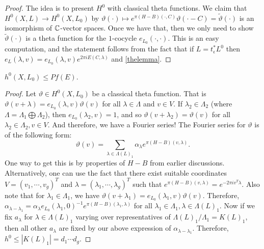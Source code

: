 \begin{proof}
The idea is to present $H^0$ with classical theta functions. We claim that $H^0(X,L)\to H^0(X,L_0)$ by $\vartheta(\cdot)\mapsto e^{\pi(H-B)(\cdot,C)}\vartheta(\cdot-C)=\tilde{\vartheta}(\cdot)$ is an isomorphism of ${\mathbb C}$-vector spaces. Once we have that, then we only need to show $\tilde{\vartheta}(\cdot)$ is a theta function for the $1$-cocycle $e_{L_0}(\cdot,\cdot)$. This is an easy computation, and the statement follows from the fact that if $L=t_\epsilon^* L^0$ then $e_L(\lambda,v)=e_{L_0}(\lambda,v)e^{2\pi i E(C,\lambda)}$ and \ref{thelemma}.
\end{proof}

\begin{lemma}
$h^0(X,L_0)\leq Pf(E)$.
\end{lemma}

\begin{proof}
Let $\vartheta\in H^0(X,L_0)$ be a classical theta function. That is $\vartheta(v+\lambda)=e_{L_0}(\lambda,v)\vartheta(v)$ for all $\lambda\in \Lambda$ and $v\in V$. If $\lambda_2\in \Lambda_2$ (where $\Lambda=\Lambda_1\bigoplus \Lambda_2$), then $e_{L_0}(\lambda_2,v)=1$, and so $\vartheta(v+\lambda_2)=\vartheta(v)$ for all $\lambda_2\in \Lambda_2, v\in V$. And therefore, we have a Fourier series! The Fourier series for $\vartheta$ is of the following form: 
$$\vartheta(v)=\sum_{\lambda\in \Lambda(L)_1}\alpha_\lambda e^{\pi (H-B)(v,\lambda)}.$$
One way to get this is by properties of $H-B$ from earlier discussions. Alternatively, one can use the fact that there exist suitable coordinates $V=(v_1,\cdots, v_g)^T$ and $\lambda=(\lambda_1,\cdots,\lambda_g)^T$ such that $e^{\pi(H-B)(v,\lambda)}=e^{-2\pi i v^T\lambda}$. 
Also note that for $\lambda_1\in \Lambda_1$, we have $\vartheta(v+\lambda_1)=e_{L_0}(\lambda_1,v)\vartheta(v)$. Therefore, 
$\alpha_{\lambda-\lambda_1}=\alpha_\lambda e_{L_0}(\lambda_1,0)^{-1}e^{\pi(H-B)(\lambda_1,\lambda)}$ for all $\lambda_1\in \Lambda_1,\lambda\in \Lambda(L)_1$. 
Now if we fix $a_\lambda$ for $\lambda\in \Lambda(L)_1$ varying over representatives of $\Lambda(L)_1/\Lambda_1=K(L)_1$, then all other $a_\lambda$ are fixed by our above expression of $\alpha_{\lambda-\lambda_1}$. Therefore, $h^0\leq |K(L)_1|=d_1\cdots d_g$. 
\end{proof}

